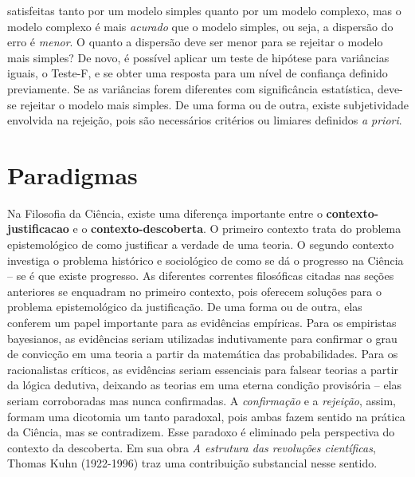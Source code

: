 \documentclass[./main.tex]{subfiles}
\begin{document}
satisfeitas tanto por um modelo simples quanto por um modelo complexo, mas o modelo complexo é mais \textit{acurado} que o modelo simples, ou seja, a dispersão do erro é \textit{menor}. O quanto a dispersão deve ser menor para se rejeitar o modelo mais simples? De novo, é possível aplicar um teste de hipótese para variâncias iguais, o Teste-F, e se obter uma resposta para um nível de confiança definido previamente. Se as variâncias forem diferentes com significância estatística, deve-se rejeitar o modelo mais simples. De uma forma ou de outra, existe subjetividade envolvida na rejeição, pois são necessários critérios ou limiares definidos \textit{a priori}.

\section{Paradigmas} \label{sec:epis:kuhn}

\par Na Filosofia da Ciência, existe uma diferença importante entre o \textbf{\gls{contexto-justificacao}} e o \textbf{\gls{contexto-descoberta}}. O primeiro contexto trata do problema epistemológico de como justificar a verdade de uma teoria. O segundo contexto investiga o problema histórico e sociológico de como se dá o progresso na Ciência – se é que existe progresso. As diferentes correntes filosóficas citadas nas seções anteriores se enquadram no primeiro contexto, pois oferecem soluções para o problema epistemológico da justificação. De uma forma ou de outra, elas conferem um papel importante para as evidências empíricas. Para os empiristas bayesianos, as evidências seriam utilizadas indutivamente para confirmar o grau de convicção em uma teoria a partir da matemática das probabilidades. Para os racionalistas críticos, as evidências seriam essenciais para falsear teorias a partir da lógica dedutiva, deixando as teorias em uma eterna condição provisória – elas seriam corroboradas mas nunca confirmadas. A \textit{confirmação} e a \textit{rejeição}, assim, formam uma dicotomia um tanto paradoxal, pois ambas fazem sentido na prática da Ciência, mas se contradizem. Esse paradoxo é eliminado pela perspectiva do contexto da descoberta. Em sua obra \textit{A estrutura das revoluções científicas}, Thomas Kuhn (1922-1996) traz uma contribuição substancial nesse sentido. 
\end{document}
